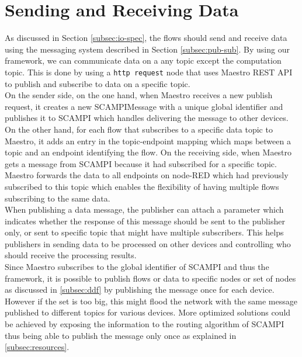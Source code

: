 \section{Sending and Receiving Data}

\noindent As discussed in Section \ref{subsec:io-spec}, the flows should send and receive data using the messaging system described in Section \ref{subsec:pub-sub}. By using our framework, we can communicate data on a any topic except the computation topic. This is done  by using a \verb|http request| node that uses Maestro REST API to publish and subscribe to data on a specific topic.\\

\noindent On the sender side, on the one hand, when Maestro receives a new publish request, it creates a new SCAMPIMessage with a unique global identifier and publishes it to SCAMPI which handles delivering the message to other devices. On the other hand, for each flow that subscribes to a specific data topic to Maestro, it  adds an entry in the topic-endpoint mapping which maps between a topic and an endpoint identifying the flow. On the receiving side, when Maestro gets a message from SCAMPI because it had subscribed for a specific topic. Maestro forwards the data to all endpoints on node-RED which had previously subscribed to this topic which  enables the flexibility of having multiple flows subscribing to the same data.\\


\noindent When  publishing a data message, the publisher can attach a parameter which indicates whether the response of this message should be sent to the publisher only, or sent to specific topic that might have multiple subscribers. This helps publishers in sending data to be processed on other devices and controlling who should receive the processing results.\\


\noindent Since Maestro subscribes to the global identifier of SCAMPI and thus the framework, it is possible to publish flows or data to specific nodes or set of nodes as discussed in \ref{subsec:ddf} by  publishing the message once for each device. However if the set is too big, this might flood the network with the same message published to different topics for various devices. More optimized solutions could be achieved by exposing the information to the routing algorithm of SCAMPI thus being able to publish the message only once as explained in \ref{subsec:resources}. \\





